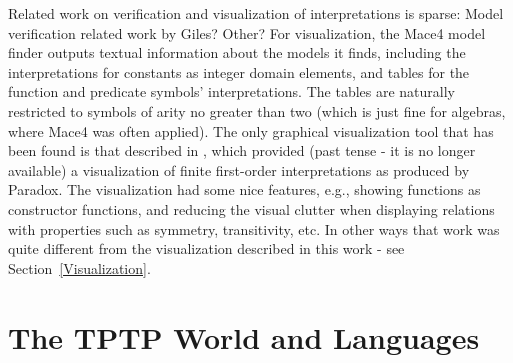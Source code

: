 \documentclass[letterpaper]{article}
\begin{document}
Related work on verification and visualization of interpretations is sparse:
Model verification related work by Giles? Other?
For visualization, the Mace4 model finder \cite{McC03-MACE4-TR} outputs textual information about 
the models it finds, including the interpretations for constants as integer domain elements, and 
tables for the function and predicate symbols' interpretations. 
The tables are naturally restricted to symbols of arity no greater than two (which is just fine
for algebras, where Mace4 was often applied).
The only graphical visualization tool that has been found is that described in \cite{Sch13-MS},
which provided (past tense - it is no longer available) a visualization of finite first-order 
interpretations as produced by Paradox.
The visualization had some nice features, e.g., showing functions as constructor functions, and 
reducing the visual clutter when displaying relations with properties such as symmetry, 
transitivity, etc.
In other ways that work was quite different from the visualization described in this work -
see Section~\ref{Visualization}.


\section{The TPTP World and Languages}
\label{TPTP}
\end{document}
